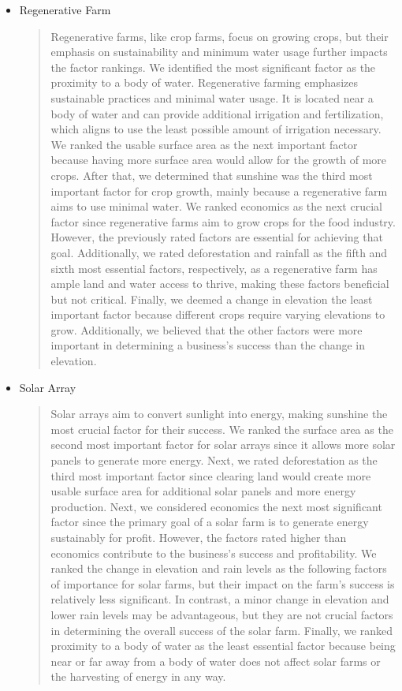 \documentclass{mcmthesis}
\begin{document}
\begin{itemize}
    \item Regenerative Farm
    \begin{quote}
        Regenerative farms, like crop farms, focus on growing crops, but their emphasis on sustainability and minimum water usage further impacts the factor rankings. We identified the most significant factor as the proximity to a body of water. Regenerative farming emphasizes sustainable practices and minimal water usage. It is located near a body of water and can provide additional irrigation and fertilization, which aligns to use the least possible amount of irrigation necessary. We ranked the usable surface area as the next important factor because having more surface area would allow for the growth of more crops. After that, we determined that sunshine was the third most important factor for crop growth, mainly because a regenerative farm aims to use minimal water. We ranked economics as the next crucial factor since regenerative farms aim to grow crops for the food industry. However, the previously rated factors are essential for achieving that goal. Additionally, we rated deforestation and rainfall as the fifth and sixth most essential factors, respectively, as a regenerative farm has ample land and water access to thrive, making these factors beneficial but not critical. Finally, we deemed a change in elevation the least important factor because different crops require varying elevations to grow. Additionally, we believed that the other factors were more important in determining a business's success than the change in elevation. 
    \end{quote}

    \item Solar Array
    \begin{quote}
        Solar arrays aim to convert sunlight into energy, making sunshine the most crucial factor for their success. We ranked the surface area as the second most important factor for solar arrays since it allows more solar panels to generate more energy. Next, we rated deforestation as the third most important factor since clearing land would create more usable surface area for additional solar panels and more energy production. Next, we considered economics the next most significant factor since the primary goal of a solar farm is to generate energy sustainably for profit. However, the factors rated higher than economics contribute to the business's success and profitability. We ranked the change in elevation and rain levels as the following factors of importance for solar farms, but their impact on the farm's success is relatively less significant. In contrast, a minor change in elevation and lower rain levels may be advantageous, but they are not crucial factors in determining the overall success of the solar farm. Finally, we ranked proximity to a body of water as the least essential factor because being near or far away from a body of water does not affect solar farms or the harvesting of energy in any way.
    \end{quote}


\end{itemize}
\end{document}
